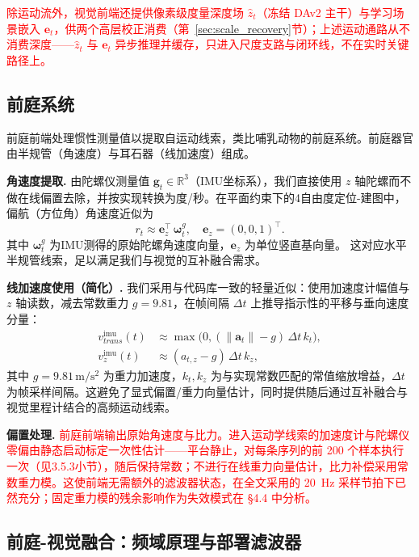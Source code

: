 \textcolor{red}{除运动流外，视觉前端还提供像素级度量深度场 $\hat z_t$（冻结 DAv2 主干）与学习场景嵌入 $\boldsymbol{e}_t$，供两个高层校正消费（第~\ref{sec:scale_recovery}节）；上述运动通路从不消费深度——$\hat z_t$ 与 $\boldsymbol{e}_t$ 异步推理并缓存，只进入尺度支路与闭环线，不在实时关键路径上。}

\subsection{前庭系统}
\label{sec:vestibular}

前庭前端处理惯性测量值以提取自运动线索，类比哺乳动物的前庭系统。前庭器官由半规管（角速度）与耳石器（线加速度）组成。

\textbf{角速度提取.} 由陀螺仪测量值 $\mathbf{g}_t\in\mathbb{R}^3$（IMU坐标系），我们直接使用 $z$ 轴陀螺而不做在线偏置去除，并按实现转换为度/秒。在平面约束下的4自由度定位-建图中，偏航（方位角）角速度近似为
\begin{equation}
    r_t \approx \mathbf{e}_z^\top\,\boldsymbol{\omega}_t^g,\quad \mathbf{e}_z=(0,0,1)^\top.
\end{equation}
其中 $\boldsymbol{\omega}_t^g$ 为IMU测得的原始陀螺角速度向量，$\mathbf{e}_z$ 为单位竖直基向量。
这对应水平半规管线索，足以满足我们与视觉的互补融合需求。

\textbf{线加速度使用（简化）.} 我们采用与代码库一致的轻量近似：使用加速度计幅值与 $z$ 轴读数，减去常数重力 $g\!=\!9.81$，在帧间隔 $\Delta t$ 上推导指示性的平移与垂向速度分量：
\begin{align}
    v^\mathrm{imu}_{trans}(t) & \approx \max\big(0, (\lVert\mathbf{a}_t\rVert - g)\,\Delta t\,k_t\big), \\
    v^\mathrm{imu}_{z}(t)     & \approx (a_{t,z} - g)\,\Delta t\,k_z,
\end{align}
其中 $g=9.81\,\mathrm{m/s^2}$ 为重力加速度，$k_t, k_z$ 为与实现常数匹配的常值缩放增益，$\Delta t$ 为帧采样间隔。这避免了显式偏置/重力向量估计，同时提供随后通过互补融合与视觉里程计结合的高频运动线索。

\textbf{偏置处理.} \textcolor{red}{前庭前端输出原始角速度与比力。进入运动学线索的加速度计与陀螺仪零偏由静态启动标定一次性估计——平台静止，对每条序列的前 200 个样本执行一次（见3.5.3小节），随后保持常数；不进行在线重力向量估计，比力补偿采用常数重力模。这使前端无需额外的滤波器状态，在全文采用的 20~Hz 采样节拍下已然充分；固定重力模的残余影响作为失效模式在 §4.4 中分析。}

\subsection{前庭-视觉融合：频域原理与部署滤波器}
\label{sec:fusion}


